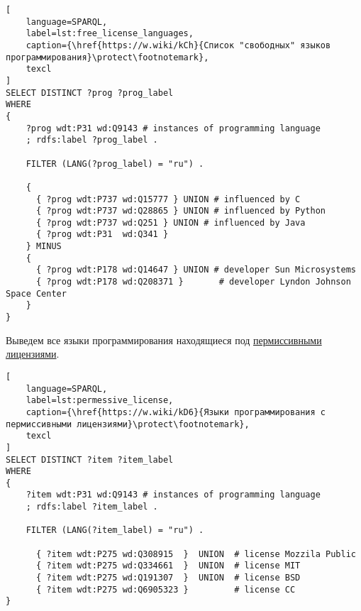 \pagebreak

\begin{lstlisting}[
	language=SPARQL,
	label=lst:free_license_languages,
	caption={\href{https://w.wiki/kCh}{Список "свободных" языков программирования}\protect\footnotemark},
	texcl
]
SELECT DISTINCT ?prog ?prog_label
WHERE
{
    ?prog wdt:P31 wd:Q9143 # instances of programming language
    ; rdfs:label ?prog_label . 

    FILTER (LANG(?prog_label) = "ru") . 

    {
      { ?prog wdt:P737 wd:Q15777 } UNION # influenced by C
      { ?prog wdt:P737 wd:Q28865 } UNION # influenced by Python
      { ?prog wdt:P737 wd:Q251 } UNION # influenced by Java
      { ?prog wdt:P31  wd:Q341 }
    } MINUS 
  	{ 
      { ?prog wdt:P178 wd:Q14647 } UNION # developer Sun Microsystems
      { ?prog wdt:P178 wd:Q208371 }       # developer Lyndon Johnson Space Center
    }
}
\end{lstlisting}


Выведем все языки программирования находящиеся под \href{https://en.wikipedia.org/wiki/Permissive_software_license}{пермиссивными лицензиями}.
\begin{lstlisting}[
	language=SPARQL,
	label=lst:permessive_license,
	caption={\href{https://w.wiki/kD6}{Языки программирования с пермиссивными лицензиями}\protect\footnotemark},
	texcl
]
SELECT DISTINCT ?item ?item_label
WHERE
{
    ?item wdt:P31 wd:Q9143 # instances of programming language
    ; rdfs:label ?item_label . 

    FILTER (LANG(?item_label) = "ru") . 
  
      { ?item wdt:P275 wd:Q308915  }  UNION  # license Mozzila Public
      { ?item wdt:P275 wd:Q334661  }  UNION  # license MIT
      { ?item wdt:P275 wd:Q191307  }  UNION  # license BSD
      { ?item wdt:P275 wd:Q6905323 }         # license CC
}
\end{lstlisting}


